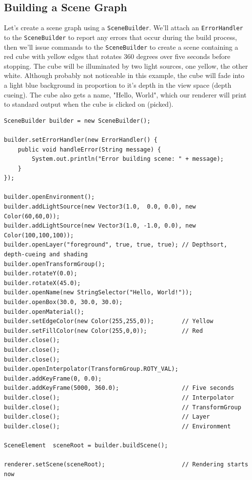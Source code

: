 \documentclass[10pt,aps, prb,preprint]{article}
\begin{document}
\subsection{Building a Scene Graph}
Let's create a scene graph using a \texttt{SceneBuilder}. We'll attach an \texttt{ErrorHandler} to the \texttt{SceneBuilder} to report any errors that occur during the build process, then we'll issue commands to the \texttt{SceneBuilder} to create a scene containing a red cube with yellow edges that rotates 360 degrees over five seconds before stopping. The cube will be illuminated by two light sources, one yellow, the other white. Although probably not noticeable in this example, the cube will fade into a light blue background in proportion to it's depth in the view space (depth cueing). The cube also gets a name, "Hello, World", which our renderer will print to standard output when the cube is clicked on (picked).

\begin{verbatim}
SceneBuilder builder = new SceneBuilder();

builder.setErrorHandler(new ErrorHandler() {
    public void handleError(String message) {
        System.out.println("Error building scene: " + message);
    }
});

builder.openEnvironment();
builder.addLightSource(new Vector3(1.0,  0.0, 0.0), new Color(60,60,0));
builder.addLightSource(new Vector3(1.0, -1.0, 0.0), new Color(100,100,100));
builder.openLayer("foreground", true, true, true); // Depthsort, depth-cueing and shading
builder.openTransformGroup();
builder.rotateY(0.0);
builder.rotateX(45.0);
builder.openName(new StringSelector("Hello, World!"));
builder.openBox(30.0, 30.0, 30.0);
builder.openMaterial();
builder.setEdgeColor(new Color(255,255,0));        // Yellow
builder.setFillColor(new Color(255,0,0));          // Red
builder.close();
builder.close();
builder.close();
builder.openInterpolator(TransformGroup.ROTY_VAL);
builder.addKeyFrame(0, 0.0);
builder.addKeyFrame(5000, 360.0);                  // Five seconds
builder.close();                                   // Interpolator
builder.close();                                   // TransformGroup
builder.close();                                   // Layer
builder.close();                                   // Environment

SceneElement  sceneRoot = builder.buildScene();

renderer.setScene(sceneRoot);                      // Rendering starts now
\end{verbatim}
\end{document}
